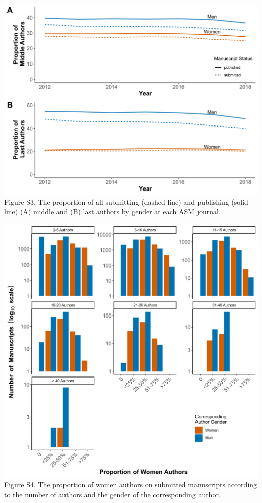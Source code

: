 \documentclass[11pt,]{article}
\begin{document}
\newpage

\includegraphics{Figure_S3.png} Figure S3. The proportion of all
submitting (dashed line) and publishing (solid line) (A) middle and (B)
last authors by gender at each ASM journal.

\newpage

\includegraphics{Figure_S4.png} Figure S4. The proportion of women
authors on submitted manuscripts according to the number of authors and
the gender of the corresponding author.
\end{document}
